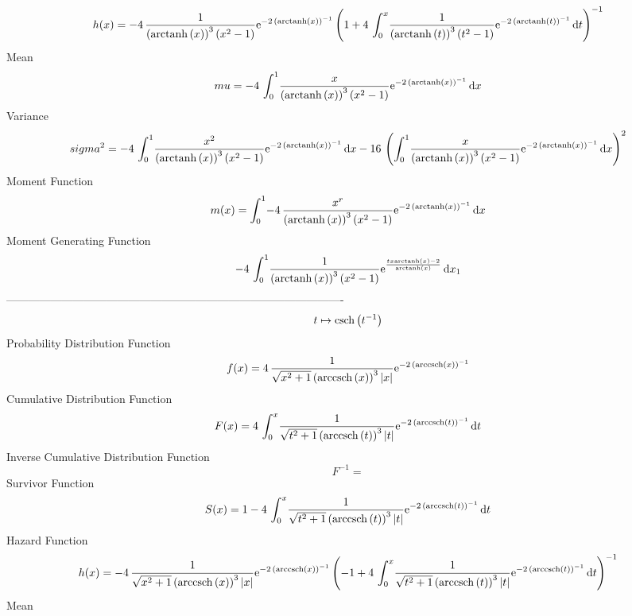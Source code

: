 \documentclass[12pt]{article}
\begin{document}
 $$ h(x)=-4\,{\frac {1}{ \left( {\rm arctanh} \left(x\right) \right) ^{3}
 \left( {x}^{2}-1 \right) }{{\rm e}^{-2\, \left( {\rm arctanh} \left(x
\right) \right) ^{-1}}} \left( 1+4\,\int_{0}^{x}\!{\frac {1}{ \left( 
{\rm arctanh} \left(t\right) \right) ^{3} \left( {t}^{2}-1 \right) }{
{\rm e}^{-2\, \left( {\rm arctanh} \left(t\right) \right) ^{-1}}}}
\,{\rm d}t \right) ^{-1}}
$$Mean 
 $$ mu=-4\,\int_{0}^{1}\!{\frac {x}{ \left( {\rm arctanh} \left(x\right)
 \right) ^{3} \left( {x}^{2}-1 \right) }{{\rm e}^{-2\, \left( 
{\rm arctanh} \left(x\right) \right) ^{-1}}}}\,{\rm d}x
$$ Variance 
 $$ sigma^2 = -4\,\int_{0}^{1}\!{\frac {{x}^{2}}{ \left( {\rm arctanh} \left(x
\right) \right) ^{3} \left( {x}^{2}-1 \right) }{{\rm e}^{-2\, \left( 
{\rm arctanh} \left(x\right) \right) ^{-1}}}}\,{\rm d}x-16\, \left( 
\int_{0}^{1}\!{\frac {x}{ \left( {\rm arctanh} \left(x\right) \right) 
^{3} \left( {x}^{2}-1 \right) }{{\rm e}^{-2\, \left( {\rm arctanh} 
\left(x\right) \right) ^{-1}}}}\,{\rm d}x \right) ^{2}
$$Moment Function 
 $$ m(x) = \int_{0}^{1}\!-4\,{\frac {{x}^{r}}{ \left( {\rm arctanh} \left(x
\right) \right) ^{3} \left( {x}^{2}-1 \right) }{{\rm e}^{-2\, \left( 
{\rm arctanh} \left(x\right) \right) ^{-1}}}}\,{\rm d}x
$$ Moment Generating Function 
 $$-4\,\int_{0}^{1}\!{\frac {1}{ \left( {\rm arctanh} \left(x\right)
 \right) ^{3} \left( {x}^{2}-1 \right) }{{\rm e}^{{\frac {tx
{\rm arctanh} \left(x\right)-2}{{\rm arctanh} \left(x\right)}}}}}
\,{\rm d}x_{{1}}
$$-------------------------------------------------------------------------------------------  \\$$t\mapsto {\rm csch} \left({t}^{-1}\right)
$$Probability Distribution Function 
$$  f(x)=4\,{\frac {1}{\sqrt {{x}^{2}+1} \left( {\rm arccsch} \left(x\right)
 \right) ^{3} \left| x \right| }{{\rm e}^{-2\, \left( {\rm arccsch} 
\left(x\right) \right) ^{-1}}}}
$$Cumulative Distribution Function  
 $$F(x)=4\,\int_{0}^{x}\!{\frac {1}{\sqrt {{t}^{2}+1} \left( {\rm arccsch} 
\left(t\right) \right) ^{3} \left| t \right| }{{\rm e}^{-2\, \left( 
{\rm arccsch} \left(t\right) \right) ^{-1}}}}\,{\rm d}t
$$ Inverse Cumulative Distribution Function 
  $$F^{-1} = $$Survivor Function 
 $$ S(x)=1-4\,\int_{0}^{x}\!{\frac {1}{\sqrt {{t}^{2}+1} \left( {\rm arccsch} 
\left(t\right) \right) ^{3} \left| t \right| }{{\rm e}^{-2\, \left( 
{\rm arccsch} \left(t\right) \right) ^{-1}}}}\,{\rm d}t
$$ Hazard Function 
 $$ h(x)=-4\,{\frac {1}{\sqrt {{x}^{2}+1} \left( {\rm arccsch} \left(x\right)
 \right) ^{3} \left| x \right| }{{\rm e}^{-2\, \left( {\rm arccsch} 
\left(x\right) \right) ^{-1}}} \left( -1+4\,\int_{0}^{x}\!{\frac {1}{
\sqrt {{t}^{2}+1} \left( {\rm arccsch} \left(t\right) \right) ^{3}
 \left| t \right| }{{\rm e}^{-2\, \left( {\rm arccsch} \left(t\right)
 \right) ^{-1}}}}\,{\rm d}t \right) ^{-1}}
$$Mean 
\end{document}
